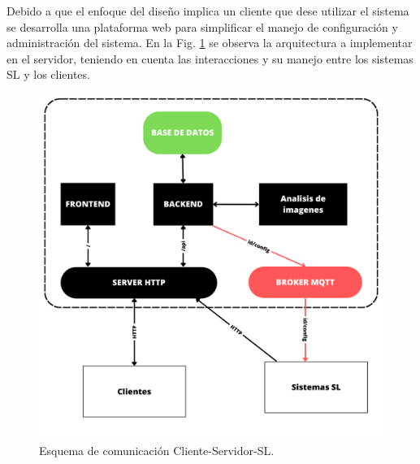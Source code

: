 Debido a que el enfoque del diseño implica un cliente que dese utilizar el sistema se desarrolla una plataforma web para simplificar el manejo de configuración y administración del sistema. En la Fig. \ref{fig:esquema-cliente-servidor-sl} se observa la arquitectura a implementar en el servidor, teniendo en cuenta las interacciones y su manejo entre los sistemas SL y los clientes.
\begin{figure}
    \centering
    \includegraphics[width=.4\textwidth]{imgs/server-clientes-barreras.png}
    \caption{Esquema de comunicación Cliente-Servidor-SL.}
    \label{fig:esquema-cliente-servidor-sl}
\end{figure}
